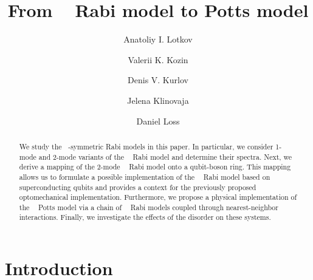 \documentclass[reprint, aps, prx, amsmath, amssymb, longbibliography, superscriptaddress]{revtex4-2}
\DeclareMathOperator{\Zthree}{\mathbb{Z}_3}
\begin{document}
\title{From \texorpdfstring{$\Zthree$}{Z3} Rabi model to Potts model}

\author{Anatoliy I. Lotkov}

\author{Valerii K. Kozin}


\author{Denis V. Kurlov}


\author{Jelena Klinovaja}

\author{Daniel Loss}



\begin{abstract}
We study the $\Zthree$-symmetric Rabi models in this paper. In particular, we consider 1-mode and 2-mode variants of the $\Zthree$ Rabi model and determine their spectra. Next, we derive a mapping of the 2-mode $\Zthree$ Rabi model onto a qubit-boson ring. This mapping allows us to formulate a possible implementation of the $\Zthree$ Rabi model based on superconducting qubits and provides a context for the previously proposed optomechanical implementation. Furthermore, we propose a physical implementation of the $\Zthree$ Potts model via a chain of $\Zthree$ Rabi models coupled through nearest-neighbor interactions. Finally, we investigate the effects of the disorder on these systems.
\end{abstract}

\maketitle


\section{Introduction}
\end{document}
